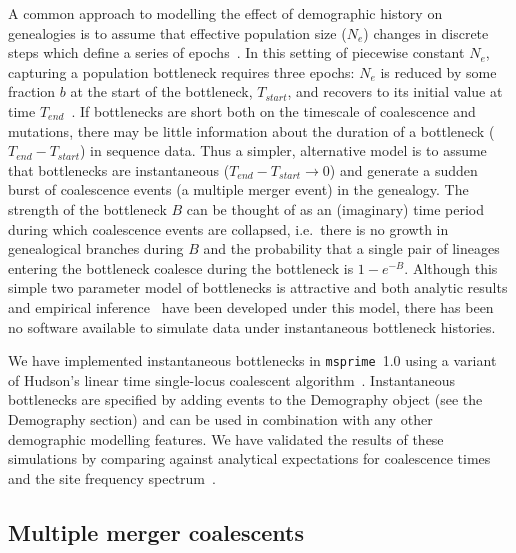 \documentclass{article}
\newcommand{\msprime}[0]{\texttt{msprime}}
\begin{document}
A common approach to modelling the effect of demographic history on genealogies
is to assume that effective population size ($N_e$) changes in discrete steps
which define a series of epochs~\citep{griffiths1994sampling, marth2004allele,
keightley2007joint,li2011inference}. In this setting of piecewise constant
$N_e$, capturing a population bottleneck requires three epochs: $N_e$ is
reduced by some fraction $b$ at the start of the bottleneck, $T_{start}$, and
recovers to its initial value at time $T_{end}$~\citep{marth2004allele}. If
bottlenecks are short both on the timescale of coalescence and mutations,
there may be little information about the duration of a bottleneck
($T_{end}-T_{start}$) in sequence data. Thus a simpler, alternative model is to
assume that bottlenecks are instantaneous ($T_{end}-T_{start} \rightarrow 0$)
and generate a sudden burst of coalescence events (a multiple merger event) in
the genealogy. The strength of the bottleneck $B$ can be thought of as an
(imaginary) time period during which coalescence events are collapsed,
i.e.\ there is no growth in genealogical branches during $B$ and the probability that a
single pair of lineages entering the bottleneck coalesce during the bottleneck
is $1-e^{-B}$. Although this simple two parameter model of bottlenecks is
attractive and both analytic results and empirical
inference~\citep{griffiths1994sampling, galtier2000detecting,
bunnefeld2015inferring} have been developed under this model, there has
been no software available to simulate data under instantaneous
bottleneck histories.

We have implemented instantaneous bottlenecks in \msprime~1.0
using a variant of Hudson's linear time single-locus coalescent
algorithm~\citep{hudson1990gene}. Instantaneous bottlenecks are specified
by adding events to the Demography object (see the Demography section)
and can be used in combination with any other demographic modelling
features. We have validated the results of these simulations by comparing
against analytical expectations for coalescence times and the
site frequency spectrum~\citep{bunnefeld2015inferring}.

\subsection*{Multiple merger coalescents}
\end{document}
